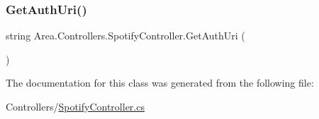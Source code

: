 \subsubsection{\texorpdfstring{Get\+Auth\+Uri()}{GetAuthUri()}}
{\footnotesize\ttfamily string Area.\+Controllers.\+Spotify\+Controller.\+Get\+Auth\+Uri (\begin{DoxyParamCaption}{ }\end{DoxyParamCaption})\hspace{0.3cm}{\ttfamily [inline]}}



The documentation for this class was generated from the following file\+:\begin{DoxyCompactItemize}
\item 
Controllers/\mbox{\hyperlink{SpotifyController_8cs}{Spotify\+Controller.\+cs}}\end{DoxyCompactItemize}
